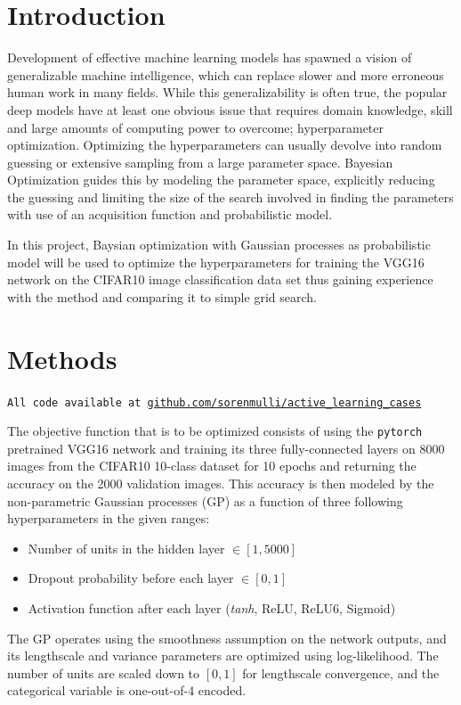 \documentclass[12pt,fleqn]{article}
\begin{document}
\begin{multicols}{2}


\section{Introduction} 
Development of effective machine learning models has spawned a vision of generalizable machine intelligence, which can replace slower and more erroneous human work in many fields. While this generalizability is often true, the popular deep models have at least one obvious issue that requires domain knowledge, skill and large amounts of computing power to overcome; hyperparameter optimization. Optimizing the hyperparameters can usually devolve into random guessing or extensive sampling from a large parameter space. Bayesian Optimization guides this by modeling the parameter space, explicitly reducing the guessing and limiting the size of the search involved in finding the parameters with use of an acquisition function and probabilistic model.

In this project, Baysian optimization with Gaussian processes as probabilistic model will be used to optimize the hyperparameters for training the VGG16 network on the CIFAR10 image classification data set thus gaining experience with the method and comparing it to simple grid search.

\section{Methods}
\texttt{All code available at \url{github.com/sorenmulli/active_learning_cases}}

The objective function that is to be optimized consists of using the \texttt{pytorch} pretrained VGG16 network \cite{vgg} and training its three fully-connected layers on 8000 images from the CIFAR10 10-class dataset \cite{cifar10} for 10 epochs and returning the accuracy on the 2000 validation images. 
This accuracy is then modeled by the non-parametric Gaussian processes (GP) as a function of three following hyperparameters in the given ranges:
\begin{itemize}
	\item Number of units in the hidden layer \(\in [1, 5000]\) 
	\item Dropout probability before each layer \(\in [0,1]\)
	\item Activation function after each layer (\textit{tanh}, ReLU, ReLU6, Sigmoid)
\end{itemize}
The GP operates using the smoothness assumption on the network outputs, and its lengthscale and variance parameters are optimized using log-likelihood. The number of units are scaled down to \([0,1]\) for lengthscale convergence, and the categorical variable is one-out-of-4 encoded. 


\end{multicols}
\end{document}
